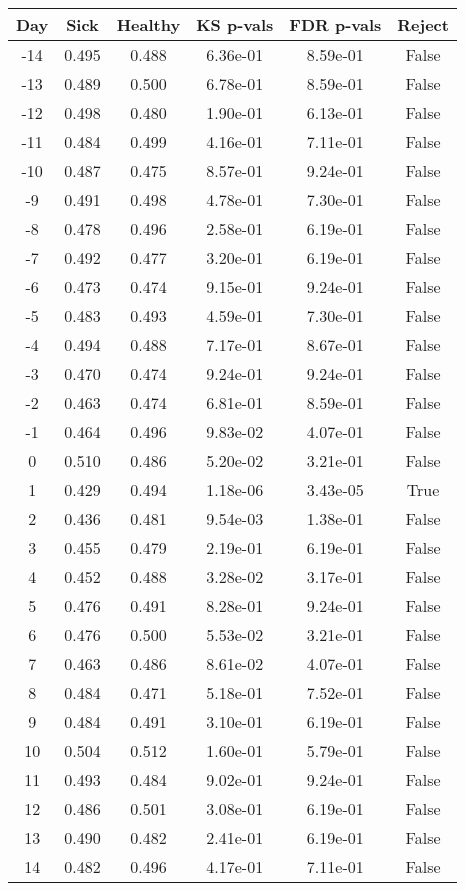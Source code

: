 \begin{tabular}{c|c|c|c|c|c}
Day &  Sick & Healthy &  KS p-vals & FDR p-vals & Reject\\
\hline
-14 & 0.495 &   0.488 &   6.36e-01 &   8.59e-01 &  False\\
-13 & 0.489 &   0.500 &   6.78e-01 &   8.59e-01 &  False\\
-12 & 0.498 &   0.480 &   1.90e-01 &   6.13e-01 &  False\\
-11 & 0.484 &   0.499 &   4.16e-01 &   7.11e-01 &  False\\
-10 & 0.487 &   0.475 &   8.57e-01 &   9.24e-01 &  False\\
 -9 & 0.491 &   0.498 &   4.78e-01 &   7.30e-01 &  False\\
 -8 & 0.478 &   0.496 &   2.58e-01 &   6.19e-01 &  False\\
 -7 & 0.492 &   0.477 &   3.20e-01 &   6.19e-01 &  False\\
 -6 & 0.473 &   0.474 &   9.15e-01 &   9.24e-01 &  False\\
 -5 & 0.483 &   0.493 &   4.59e-01 &   7.30e-01 &  False\\
 -4 & 0.494 &   0.488 &   7.17e-01 &   8.67e-01 &  False\\
 -3 & 0.470 &   0.474 &   9.24e-01 &   9.24e-01 &  False\\
 -2 & 0.463 &   0.474 &   6.81e-01 &   8.59e-01 &  False\\
 -1 & 0.464 &   0.496 &   9.83e-02 &   4.07e-01 &  False\\
  0 & 0.510 &   0.486 &   5.20e-02 &   3.21e-01 &  False\\
  1 & 0.429 &   0.494 &   1.18e-06 &   3.43e-05 &   True\\
  2 & 0.436 &   0.481 &   9.54e-03 &   1.38e-01 &  False\\
  3 & 0.455 &   0.479 &   2.19e-01 &   6.19e-01 &  False\\
  4 & 0.452 &   0.488 &   3.28e-02 &   3.17e-01 &  False\\
  5 & 0.476 &   0.491 &   8.28e-01 &   9.24e-01 &  False\\
  6 & 0.476 &   0.500 &   5.53e-02 &   3.21e-01 &  False\\
  7 & 0.463 &   0.486 &   8.61e-02 &   4.07e-01 &  False\\
  8 & 0.484 &   0.471 &   5.18e-01 &   7.52e-01 &  False\\
  9 & 0.484 &   0.491 &   3.10e-01 &   6.19e-01 &  False\\
 10 & 0.504 &   0.512 &   1.60e-01 &   5.79e-01 &  False\\
 11 & 0.493 &   0.484 &   9.02e-01 &   9.24e-01 &  False\\
 12 & 0.486 &   0.501 &   3.08e-01 &   6.19e-01 &  False\\
 13 & 0.490 &   0.482 &   2.41e-01 &   6.19e-01 &  False\\
 14 & 0.482 &   0.496 &   4.17e-01 &   7.11e-01 &  False\\
\end{tabular}